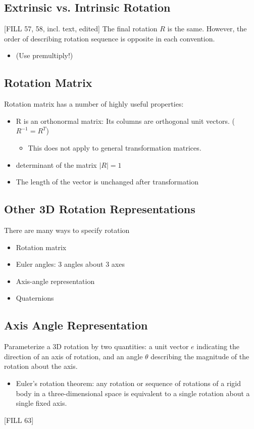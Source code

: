 \documentclass[10pt]{article}
\begin{document}
\subsection*{Extrinsic vs. Intrinsic Rotation}
[FILL 57, 58, incl. text, edited]
The final rotation $R$ is the same.  However, the order of describing rotation sequence is opposite in each convention.
\begin{itemize}
	\item (Use premultiply!)
\end{itemize}

\subsection*{Rotation Matrix}
Rotation matrix has a number of highly useful properties:
\begin{itemize}
	\item R is an orthonormal matrix: Its columns are orthogonal unit vectors. ($R^{-1} = R^T$)
	\begin{itemize}
        \item This does not apply to general transformation matrices.
    \end{itemize}
	\item determinant of the matrix $|R| = 1$
	\item The length of the vector is unchanged after transformation
\end{itemize}

\subsection*{Other 3D Rotation Representations}
There are many ways to specify rotation
\begin{itemize}
	\item Rotation matrix
	\item Euler angles: 3 angles about 3 axes
	\item Axis-angle representation
	\item Quaternions
\end{itemize}

\subsection*{Axis Angle Representation}
Parameterize a 3D rotation by two quantities: a unit vector $e$ indicating the direction of an axis of rotation, and an angle $\theta$ describing the magnitude of the rotation about the axis.
\begin{itemize}
	\item Euler's rotation theorem: any rotation or sequence of rotations of a rigid body in a three-dimensional space is equivalent to a single rotation about a single fixed axis.
\end{itemize}
[FILL 63]
\end{document}

